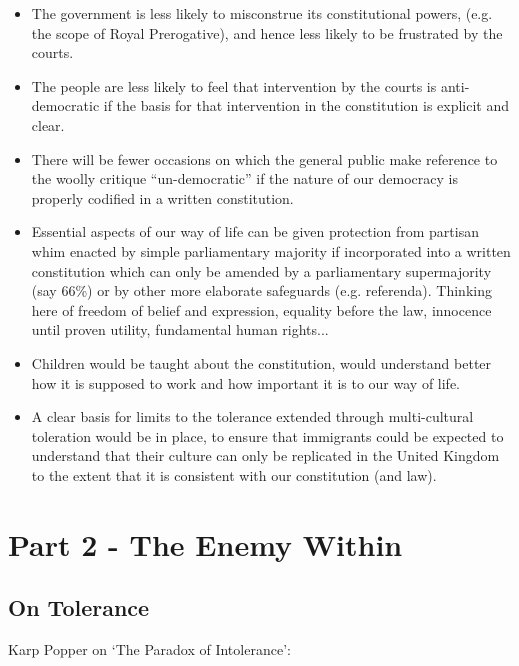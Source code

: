 \documentclass[14pt,titlepage]{extarticle}
\begin{document}
\begin{itemize}
\item The government is less likely to misconstrue its constitutional powers, (e.g. the scope of Royal Prerogative), and hence less likely to be frustrated by the courts.
\item The people are less likely to feel that intervention by the courts is anti-democratic if the basis for that intervention in the constitution is explicit and clear.
\item There will be fewer occasions on which the general public make reference to the woolly critique ``un-democratic'' if the nature of our democracy is properly codified in a written constitution.
\item Essential aspects of our way of life can be given protection from partisan whim enacted by simple parliamentary majority if incorporated into a written constitution which can only be amended by a parliamentary supermajority (say 66\%) or by other more elaborate safeguards (e.g. referenda).
  Thinking here of freedom of belief and expression, equality before the law, innocence until proven utility, fundamental human rights...
\item Children would be taught about the constitution, would understand better how it is supposed to work and how important it is to our way of life.
\item A clear basis for limits to the tolerance extended through multi-cultural toleration would be in place, to ensure that immigrants could be expected to understand that their culture can only be replicated in the United Kingdom to the extent that it is consistent with our constitution (and law).
\end{itemize}

\section{Part 2 - The Enemy Within}\label{part2}

\subsection{On Tolerance}

Karp Popper on `The Paradox of Intolerance':
\end{document}
